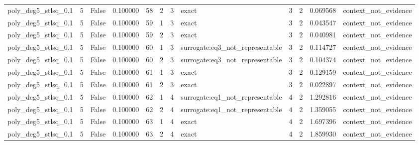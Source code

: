 \begin{tabular}{lrrrrrrlrrrl}
poly\_deg5\_stlsq\_0.1 & 5 & False & 0.100000 & 58 & 2 & 3 & exact & 3 & 2 & 0.069568 & context\_not\_evidence \\
poly\_deg5\_stlsq\_0.1 & 5 & False & 0.100000 & 59 & 1 & 3 & exact & 3 & 2 & 0.043547 & context\_not\_evidence \\
poly\_deg5\_stlsq\_0.1 & 5 & False & 0.100000 & 59 & 2 & 3 & exact & 3 & 2 & 0.040981 & context\_not\_evidence \\
poly\_deg5\_stlsq\_0.1 & 5 & False & 0.100000 & 60 & 1 & 3 & surrogate:eq3\_not\_representable & 3 & 2 & 0.114727 & context\_not\_evidence \\
poly\_deg5\_stlsq\_0.1 & 5 & False & 0.100000 & 60 & 2 & 3 & surrogate:eq3\_not\_representable & 3 & 2 & 0.104374 & context\_not\_evidence \\
poly\_deg5\_stlsq\_0.1 & 5 & False & 0.100000 & 61 & 1 & 3 & exact & 3 & 2 & 0.129159 & context\_not\_evidence \\
poly\_deg5\_stlsq\_0.1 & 5 & False & 0.100000 & 61 & 2 & 3 & exact & 3 & 2 & 0.022897 & context\_not\_evidence \\
poly\_deg5\_stlsq\_0.1 & 5 & False & 0.100000 & 62 & 1 & 4 & surrogate:eq1\_not\_representable & 4 & 2 & 1.292816 & context\_not\_evidence \\
poly\_deg5\_stlsq\_0.1 & 5 & False & 0.100000 & 62 & 2 & 4 & surrogate:eq1\_not\_representable & 4 & 2 & 1.359055 & context\_not\_evidence \\
poly\_deg5\_stlsq\_0.1 & 5 & False & 0.100000 & 63 & 1 & 4 & exact & 4 & 2 & 1.697396 & context\_not\_evidence \\
poly\_deg5\_stlsq\_0.1 & 5 & False & 0.100000 & 63 & 2 & 4 & exact & 4 & 2 & 1.859930 & context\_not\_evidence \\
\bottomrule
\end{tabular}
